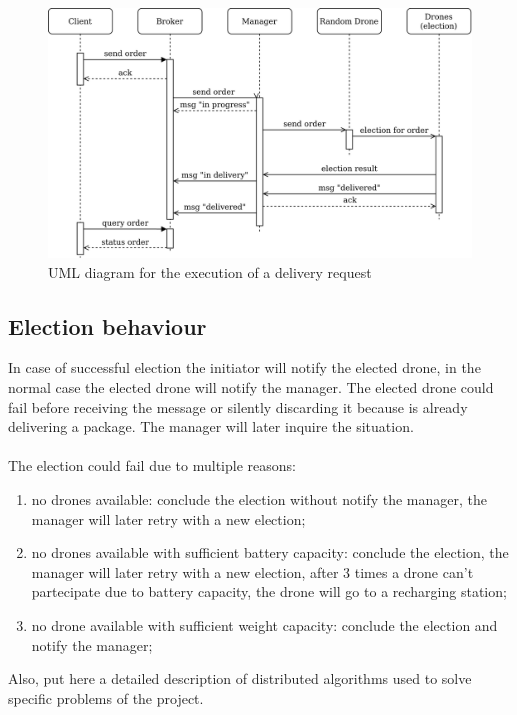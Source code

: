 \documentclass[a4paper, oneside]{memoir}
\begin{document}
\begin{figure}[h!]
	\centering
	\includegraphics[width=\linewidth]{New-order}
	\caption{UML diagram for the execution of a delivery request}
\end{figure}

\subsection{Election behaviour}
In case of successful election the initiator will notify the elected drone, in the normal case the elected drone will notify the manager.
The elected drone could fail before receiving the message or silently discarding it because is already delivering a package. The manager will later inquire the situation.
\\\\
The election could fail due to multiple reasons:
\begin{enumerate}
	\item no drones available: conclude the election without notify the manager, the manager will later retry with a new election;
	\item no drones available with sufficient battery capacity: conclude the election, the manager will later retry with a new election, after 3 times a drone can't partecipate due to battery capacity, the drone will go to a recharging station;
	\item no drone available with sufficient weight capacity: conclude the election and notify the manager;
\end{enumerate}



Also, put here a detailed description of distributed algorithms used to solve specific problems of the project.
\end{document}
